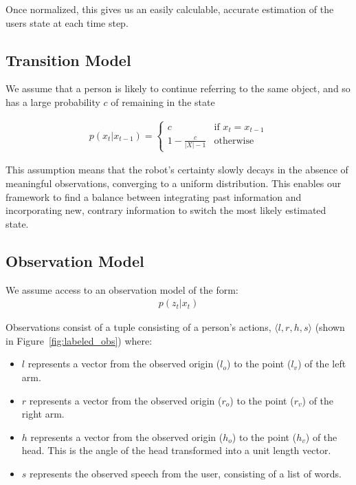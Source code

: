\documentclass[a4paper, 11pt]{article} %
\begin{document}
Once normalized, this gives us an easily calculable, accurate estimation of the users state at each time step.
\subsection{Transition Model}
We assume that a person is likely to continue referring to the same
object, and so has a large probability $c$ of remaining in the state

\begin{align}
p(x_t | x_{t-1}) = \left\{  \begin{array}{ll}
c&\mbox{if } x_t = x_{t-1}\\
1-\frac{c}{|X|-1}&\mbox{otherwise}
\end{array}\right.
\end{align}

This assumption means that the robot's certainty slowly decays in the absence of meaningful observations, converging to a uniform distribution. This enables our framework to find a balance between integrating past information and incorporating new, contrary information to switch the most likely estimated state.
\subsection{Observation Model}
We assume access to an observation model of the form:
\begin{align}
p(z_t | x_t)
\end{align}

Observations consist of a tuple consisting of a person's actions,
$\langle l, r, h, s\rangle $ (shown in Figure~\ref{fig:labeled_obs}) where:
\begin{itemize}
    \item $l$ represents a vector from the observed origin ($l_o$) to the point ($l_v$) of the left arm.
    \item $r$ represents a vector from the observed origin ($r_o$) to the point ($r_v$) of the right arm.
    \item $h$ represents a vector from the observed origin ($h_o$) to the point ($h_v$) of the head. This is the angle of the head transformed into a unit length vector.
    \item $s$ represents the observed speech from the user,
          consisting of a list of words.
    \end{itemize}
\end{document}
